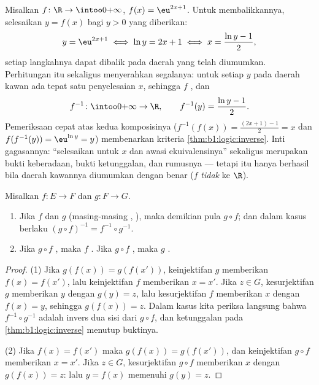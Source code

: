 \begin{example}\label{ex:b1:logic:inversecomp}
Misalkan $f \colon \R \to \intoo0{+\infty}$, $f(x) = \eu^{2x+1}$.
Untuk membalikkannya, selesaikan $y = f(x)$ bagi $y > 0$ yang
diberikan:
\[
y = \eu^{2x+1} \iff \ln y = 2x + 1 \iff x = \frac{\ln y - 1}2 ,
\]
setiap langkahnya dapat dibalik pada daerah yang telah diumumkan.
Perhitungan itu sekaligus menyerahkan segalanya: untuk setiap $y$ pada
daerah kawan ada tepat satu penyelesaian $x$, sehingga $f$ ,
dan
\[
f^{-1} \colon \intoo0{+\infty} \to \R,
\qquad
f^{-1}(y) = \frac{\ln y - 1}2 .
\]
Pemeriksaan cepat atas kedua komposisinya ($f^{-1}(f(x)) = \frac{(2x+1) -
1}2 = x$ dan $f(f^{-1}(y)) = \eu^{\ln y} = y$) membenarkan kriteria
\cref{thm:b1:logic:inverse}. Inti gagasannya: ``selesaikan untuk $x$
dan awasi ekuivalensinya'' sekaligus merupakan bukti keberadaan, bukti
ketunggalan, dan rumusnya --- tetapi itu hanya berhasil bila daerah
kawannya diumumkan dengan benar ($f$ \emph{tidak}
 ke $\R$).
\end{example}

\begin{proposition}\label{prop:b1:logic:comp}
Misalkan $f \colon E \to F$ dan $g \colon F \to G$.
\begin{enumerate}
  \item Jika $f$ dan $g$  (masing-masing , ),
        maka demikian pula $g \circ f$; dan dalam kasus 
        berlaku $(g \circ f)^{-1} = f^{-1} \circ
        g^{-1}$.
  \item Jika $g \circ f$ , maka $f$ . Jika
        $g \circ f$ , maka $g$ .
\end{enumerate}
\end{proposition}

\begin{proof}
(1) Jika $g(f(x)) = g(f(x'))$, keinjektifan $g$ memberikan
$f(x) = f(x')$, lalu keinjektifan $f$ memberikan $x = x'$. Jika
$z \in G$, kesurjektifan $g$ memberikan $y$ dengan $g(y) = z$, lalu
kesurjektifan $f$ memberikan $x$ dengan
$f(x) = y$, sehingga $g(f(x)) = z$. Dalam kasus  kita periksa
langsung bahwa $f^{-1} \circ g^{-1}$ adalah invers dua sisi dari
$g \circ f$, dan ketunggalan pada \cref{thm:b1:logic:inverse} menutup
buktinya.

(2) Jika $f(x) = f(x')$ maka $g(f(x)) = g(f(x'))$, dan keinjektifan
$g \circ f$ memberikan $x = x'$. Jika $z \in G$, kesurjektifan
$g \circ f$ memberikan $x$ dengan $g(f(x)) = z$: lalu $y = f(x)$
memenuhi $g(y) = z$.
\end{proof}


